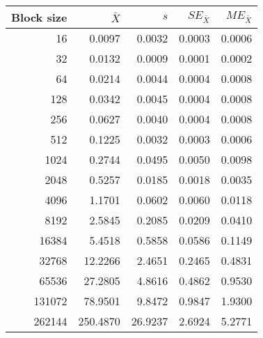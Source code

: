 \begin{tabular}{rrrrr}\toprule
{\small Block size} & $\bar{X}$ & $s$ & $SE_{\bar{X}}$ & $ME_{\bar{X}}$ \\\midrule
16 & 0.0097 & 0.0032 & 0.0003 & 0.0006\\
32 & 0.0132 & 0.0009 & 0.0001 & 0.0002\\
64 & 0.0214 & 0.0044 & 0.0004 & 0.0008\\
128 & 0.0342 & 0.0045 & 0.0004 & 0.0008\\
256 & 0.0627 & 0.0040 & 0.0004 & 0.0008\\
512 & 0.1225 & 0.0032 & 0.0003 & 0.0006\\
1024 & 0.2744 & 0.0495 & 0.0050 & 0.0098\\
2048 & 0.5257 & 0.0185 & 0.0018 & 0.0035\\
4096 & 1.1701 & 0.0602 & 0.0060 & 0.0118\\
8192 & 2.5845 & 0.2085 & 0.0209 & 0.0410\\
16384 & 5.4518 & 0.5858 & 0.0586 & 0.1149\\
32768 & 12.2266 & 2.4651 & 0.2465 & 0.4831\\
65536 & 27.2805 & 4.8616 & 0.4862 & 0.9530\\
131072 & 78.9501 & 9.8472 & 0.9847 & 1.9300\\
262144 & 250.4870 & 26.9237 & 2.6924 & 5.2771\\
\bottomrule
\end{tabular}
